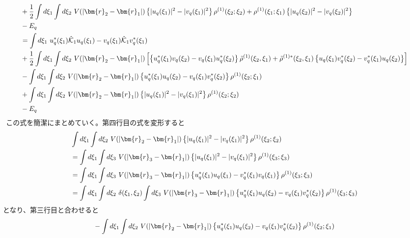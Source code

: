 \documentclass[dvipdfmx, 11pt, a4paper]{jsarticle}
\numberwithin{equation}{section}
\theoremstyle{definition}
\begin{document}
\begin{derivationBox}
\begin{align}
            &+ \frac{1}{2} \int d\xi_1\int d\xi_2\ V(\left| \bm{r}_2-\bm{r}_1 \right|) \left\{  |u_q(\xi_1)|^2-|v_q(\xi_1)|^2 \right\}\rho^{(1)}(\xi_2;\xi_2) + \rho^{(1)}(\xi_1;\xi_1)\left\{  |u_q(\xi_2)|^2-|v_q(\xi_2)|^2 \right\} \notag \\
            &-E_q \notag \\
            &= \int d\xi_1\ u_{q}^*(\xi_1)\hat{\mathcal{K}}_1  u_{q}(\xi_1)-v_{q}(\xi_1) \hat{\mathcal{K}}_1 v_{q}^*(\xi_1) \notag \\
            &+ \frac{1}{2} \int d\xi_1 \int d\xi_2\ V(\left| \bm{r}_2-\bm{r}_1 \right|) \left[ \left\{ u_q^*(\xi_1) v_q(\xi_2) - v_q(\xi_1) u_q^*(\xi_2)\right\} \tilde{\rho}^{(1)}(\xi_2,\xi_1) +  \tilde{\rho}^{(1)*}(\xi_2,\xi_1)\left\{   u_q(\xi_1)v^*_q(\xi_2) - v^*_q(\xi_1)u_q(\xi_2)  \right\}\right] \notag \\
            &-   \int d\xi_1 \int d\xi_2\ V(\left| \bm{r}_2-\bm{r}_1 \right|) \left\{ u_{q}^*(\xi_1)u_{q}(\xi_2)-v_{q}(\xi_1)v_{q}^*(\xi_2) \right\} \rho^{(1)}(\xi_2;\xi_1)    \notag \\
            &+  \int d\xi_1\int  d\xi_2\ V(\left| \bm{r}_2-\bm{r}_1 \right|) \left\{  |u_q(\xi_1)|^2-|v_q(\xi_1)|^2 \right\}\rho^{(1)}(\xi_2;\xi_2)  \notag \\
            &-E_q \label{GrandPOtenPari}
        \end{align}
        $\ \ $この式を簡潔にまとめていく。第四行目の式を変形すると
        \begin{align}
            & \int d\xi_1 \int d\xi_2\ V(\left| \bm{r}_2-\bm{r}_1 \right|) \left\{  |u_q(\xi_1)|^2-|v_q(\xi_1)|^2 \right\}\rho^{(1)}(\xi_2;\xi_2)  \notag \\
            &= \int d\xi_1 \int d\xi_3\ V(\left| \bm{r}_3-\bm{r}_1 \right|) \left\{  |u_q(\xi_1)|^2-|v_q(\xi_1)|^2 \right\}\rho^{(1)}(\xi_3;\xi_3)  \notag \\
            &= \int d\xi_1 \int d\xi_3\ V(\left| \bm{r}_3-\bm{r}_1 \right|) \left\{  u_q^*(\xi_1)u_q(\xi_1)-v_q^*(\xi_1)v_q(\xi_1) \right\}\rho^{(1)}(\xi_3;\xi_3)  \notag \\
            &= \int d\xi_1 \int d\xi_2\ \delta(\xi_1,\xi_2)\int d\xi_3\ V(\left| \bm{r}_3-\bm{r}_1 \right|) \left\{  u_q^*(\xi_1)u_q(\xi_2)-v_q(\xi_1)v_q^*(\xi_2) \right\}\rho^{(1)}(\xi_3;\xi_3)  \notag \\
        \end{align}
        となり、第三行目と合わせると
        \begin{align}
            &-   \int d\xi_1 \int d\xi_2\ V(\left| \bm{r}_2-\bm{r}_1 \right|) \left\{ u_{q}^*(\xi_1)u_{q}(\xi_2)-v_{q}(\xi_1)v_{q}^*(\xi_2) \right\} \rho^{(1)}(\xi_2;\xi_1)    \notag \\

\end{align}
\end{derivationBox}
\end{document}

